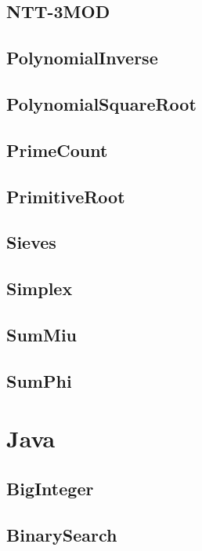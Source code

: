 \documentclass{article}
\begin{document}
\subsection{NTT-3MOD}

\subsection{PolynomialInverse}

\subsection{PolynomialSquareRoot}

\subsection{PrimeCount}

\subsection{PrimitiveRoot}

\subsection{Sieves}

\subsection{Simplex}

\subsection{SumMiu}

\subsection{SumPhi}

\section{Java}
\subsection{BigInteger}

\subsection{BinarySearch}

\end{document}
